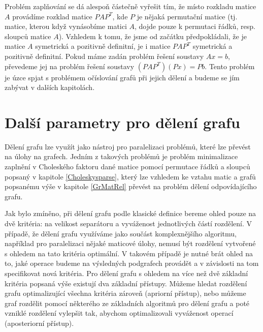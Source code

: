 \documentclass{ctuthesis}
\theoremstyle{plain}
\theoremstyle{definition}
\begin{document}
Problém zaplňování se dá alespoň částečně vyřešit tím, že místo rozkladu matice $A$ provádíme rozklad matice $PAP^T$, kde $P$ je nějaká permutační matice (tj. matice, kterou když vynásobíme matici $A$, dojde pouze k permutaci řádků, resp. sloupců matice $A$). Vzhledem k tomu, že jsme od začátku předpokládali, že je matice $A$ symetrická a pozitivně definitní, je i matice $PAP^T$ symetrická a pozitivně definitní. Pokud máme zadán problém řešení soustavy $Ax=b$, převedeme jej na problém řešení soustavy $(PAP^T)(Px)=Pb$. Tento problém je úzce spjat s problémem očíslování grafů při jejich dělení a budeme se jím zabývat v dalších kapitolách.


\chapter{Další parametry pro dělení grafu}
\label{dalsiParametry}

Dělení grafu lze využít jako nástroj pro paralelizaci problémů, které lze převést na úlohy na grafech. Jedním z takových problémů je problém minimalizace zaplnění v Choleského faktoru dané matice pomocí permutace řádků a sloupců popsaný v kapitole \ref{Choleskysparse}, který lze vzhledem ke vztahu matic a grafů popsanému výše v kapitole \ref{GrMatRel} převést na problém dělení odpovídajícího grafu.

Jak bylo zmíněno, při dělení grafu podle klasické definice bereme ohled pouze na dvě kritéria: na velikost separátoru a vyváženost jednotlivých částí rozdělení. V případě, že dělení grafu využíváme jako součást komplexnějšího algoritmu, například pro paralelizaci nějaké maticové úlohy, nemusí být rozdělení vytvořené s ohledem na tato kritéria optimální. V takovém případě je nutné brát ohled na to, jaké operace budeme na výsledných podgrafech provádět a v závislosti na tom specifikovat nová kritéria. Pro dělení grafu s ohledem na více než dvě základní kritéria popsaná výše existují dva základní přístupy. Můžeme hledat rozdělení grafu optimalizující všechna kritéria zároveň (apriorní přístup), nebo můžeme graf rozdělit pomocí některého ze základních algoritmů pro dělení grafu a poté vzniklé rozdělení vylepšit tak, abychom optimalizovali vyváženost operací (aposteriorní přístup).
\end{document}

